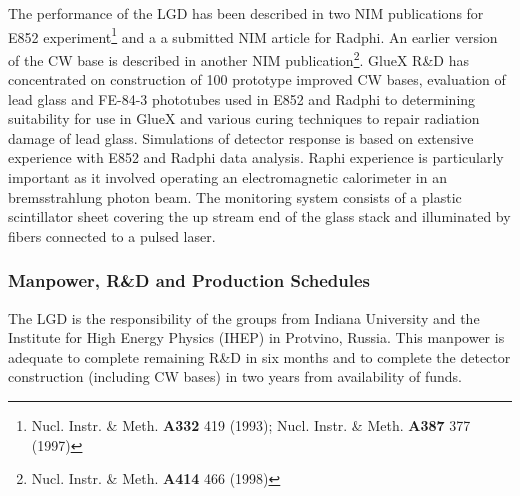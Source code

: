 The performance of the LGD has been described in two NIM publications for E852 
experiment\footnote{Nucl. Instr. \& Meth. \textbf{A332} 419 (1993); 
 Nucl. Instr. \& Meth. \textbf{A387} 377 (1997)} 
and a a submitted NIM article for Radphi. An earlier version of the CW base is described
in another NIM
publication\footnote{Nucl. Instr. \& Meth. \textbf{A414} 466 (1998)}.  GlueX R\&D has concentrated on
construction of 100 prototype improved CW bases, evaluation of  lead glass and FE-84-3
phototubes used in E852 and Radphi to
determining suitability for use in GlueX and various curing techniques to repair radiation damage of
lead glass.  Simulations of detector response is based on extensive
experience with E852 and Radphi data analysis.  Raphi experience is particularly important
as it involved operating an electromagnetic calorimeter in an bremsstrahlung
photon beam.
The monitoring system consists of a plastic scintillator sheet covering the 
up stream end of the glass stack
and illuminated by fibers connected to a pulsed laser.  



\subsubsection*{Manpower, R\&D and Production Schedules}

The LGD is the responsibility of the groups from Indiana University and the Institute for
High Energy Physics (IHEP) in Protvino, Russia.  This manpower is adequate to complete
remaining R\&D in six months and to complete the detector construction (including CW bases) in
two years from availability of funds.

